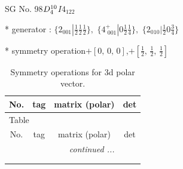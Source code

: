 \documentclass[fleqn,8pt]{jsarticle}
\begin{document}
\setcounter{MaxMatrixCols}{32}

\renewcommand{\tablename}{Table~}
\renewcommand{\figurename}{Figure~}
\begin{center}
\LARGE
SG No. 98\quad$D_{\rm 4}^{10}$\quad$I4_122$\quad[ tetragonal ]
\end{center}

* generator : $\{2{}_{001}|\frac{1}{2} \frac{1}{2} \frac{1}{2}\},\,\,\{4^{+}_{\,\,001}|0 \frac{1}{2} \frac{1}{4}\},\,\,\{2{}_{010}|\frac{1}{2} 0 \frac{3}{4}\}$

* symmetry operation\quad$+\left[ 0,\, 0,\, 0 \right]$,\quad $+\left[ \frac{1}{2},\, \frac{1}{2},\, \frac{1}{2} \right]$
\renewcommand{\arraystretch}{1.3}
\begin{longtable}{cccc}
\caption{Symmetry operations for 3d polar vector.}
 \\
 \hline \hline
No. & tag & matrix (polar) & det \\ \hline \endfirsthead

\multicolumn{3}{l}{\tablename\ \thetable{}} \\
 \hline \hline
No. & tag & matrix (polar) & det \\ \hline \endhead

 \hline \hline
\multicolumn{3}{r}{\footnotesize\it continued ...} \\ \endfoot

 \hline \hline
\multicolumn{3}{r}{} \\ \endlastfoot


\end{longtable}
\end{document}
